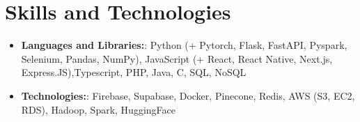 \documentclass[letterpaper,11pt]{article}
\makeatletter
\newcommand{\resumeItem}[2]{
  \item\small{
    \textbf{#1}{: #2 \vspace{-2pt}}
  }
}
\newcommand{\resumeItemNoHeader}[2]{
  \item\small{
    {#2 \vspace{-2pt}}
  }
}
\newcommand{\resumeSubheadingSmall}[4]{
  \vspace{-1pt}\item
    \begin{tabular*}{0.97\textwidth}[t]{l@{\extracolsep{\fill}}r}
      \textbf{#1} & #2 \\
      
    \end{tabular*}\vspace{-5pt}
}
\newcommand{\resumeSubItem}[2]{\resumeItem{#1}{#2}\vspace{-4pt}}
\newcommand{\resumeSubHeadingListStart}{\begin{itemize}[leftmargin=*]}
\newcommand{\resumeSubHeadingListEnd}{\end{itemize}}
\newcommand{\resumeItemListStart}{\begin{itemize}}
\newcommand{\resumeItemListEnd}{\end{itemize}\vspace{-8pt}}
\makeatother
\begin{document}

    


    
  
      

%
\section{Skills and Technologies}
 \resumeSubHeadingListStart
   \resumeSubItem{Languages and Libraries:}
      {Python (+ Pytorch, Flask, FastAPI, Pyspark, Selenium, Pandas, NumPy), JavaScript (+ React, React Native, Next.js, Express.JS),Typescript, PHP, Java, C, SQL, NoSQL}
    \resumeSubItem{Technologies:}
    {Firebase, Supabase, Docker, Pinecone, Redis, AWS (S3, EC2, RDS), Hadoop, Spark, HuggingFace}
      
   
 \resumeSubHeadingListEnd


\end{document}
